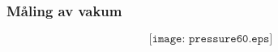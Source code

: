 \documentclass[aspectratio=169,xcolor=dvipsnames]{beamer}
\begin{document}
%
%
%
%
%
%
%
%
%
%
\begin{frame}
	\frametitle{Måling av vakum}

	$$\texttt{[image: pressure60.eps]}$$
\end{frame}
\end{document}

